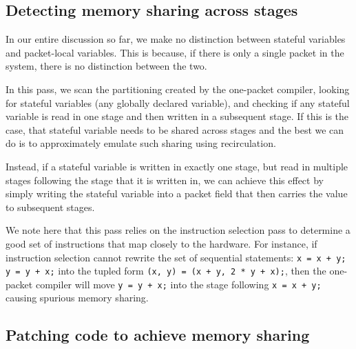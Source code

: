 

\subsection{Detecting memory sharing across stages}
In our entire discussion so far, we make no distinction between stateful
variables and packet-local variables. This is because, if there is only a
single packet in the system, there is no distinction between the two.

In this pass, we scan the partitioning created by the one-packet compiler,
looking for stateful variables (any globally declared variable), and checking
if any stateful variable is read in one stage and then written in a subsequent
stage. If this is the case, that stateful variable needs to be shared across
stages and the best we can do is to approximately emulate such sharing using
recirculation.

Instead, if a stateful variable is written in exactly one stage, but read in
multiple stages following the stage that it is written in, we can achieve this
effect by simply writing the stateful variable into a packet field that then
carries the value to subsequent stages.

We note here that this pass relies on the instruction selection pass to
determine a good set of instructions that map closely to the hardware. For
instance, if instruction selection cannot rewrite the set of sequential
statements: \texttt{x = x + y; y = y + x;} into the tupled form \texttt{(x, y)
= (x + y, 2 * y + x);}, then the one-packet compiler will move \texttt{y = y +
x;} into the stage following \texttt{x = x + y;} causing spurious memory
sharing.

\subsection{Patching code to achieve memory sharing}

